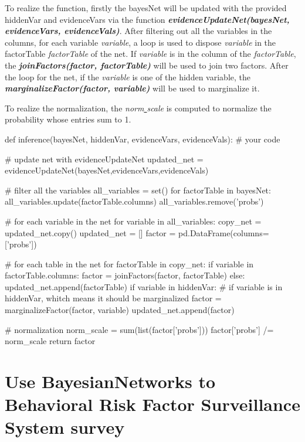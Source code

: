 \documentclass[aps,letterpaper,10pt]{revtex4}
\begin{document}
To realize the function, firstly the bayesNet will be updated with the provided hiddenVar and evidenceVars via the function \emph{\textbf{evidenceUpdateNet(bayesNet, evidenceVars, evidenceVals)}}. After filtering out all the variables in the columns, for each variable \emph{variable}, a loop is used to dispose \emph{variable} in the factorTable \emph{factorTable} of the net. If \emph{variable} is in the column of the \emph{factorTable}, the \emph{\textbf{joinFactors(factor, factorTable)}} will be used to join two factors. After the loop for the net, if the \emph{variable} is one of the hidden variable, the \emph{\textbf{marginalizeFactor(factor, variable)}} will be used to marginalize it. 

To realize the normalization, the \emph{norm\underline{ }scale} is computed to normalize the probability whose entries sum to 1.

\begin{python}
def inference(bayesNet, hiddenVar, evidenceVars, evidenceVals):
    # your code 

    # update net with evidenceUpdateNet
    updated_net = evidenceUpdateNet(bayesNet,evidenceVars,evidenceVals)

    # filter all the variables
    all_variables = set()
    for factorTable in bayesNet:
        all_variables.update(factorTable.columns)
    all_variables.remove('probs')

    # for each variable in the net
    for variable in all_variables:
        copy_net = updated_net.copy()
        updated_net = []
        factor = pd.DataFrame(columns=['probs'])
        
        # for each table in the net
        for factorTable in copy_net:
            if variable in factorTable.columns:
                factor = joinFactors(factor, factorTable)
            else:
                updated_net.append(factorTable)
        if variable in hiddenVar:
            # if variable is in hiddenVar, whitch means it should be marginalized
            factor = marginalizeFactor(factor, variable)
        updated_net.append(factor)
    
    # normalization
    norm_scale = sum(list(factor['probs']))
    factor['probs'] /= norm_scale
    return factor

\end{python}
\newpage

\section{Use BayesianNetworks to Behavioral Risk Factor Surveillance System survey}
\end{document}
